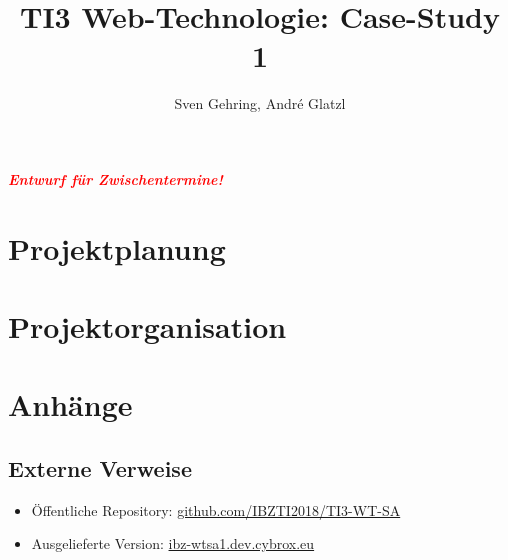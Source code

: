 \documentclass{article}
\begin{document}

\title{TI3 Web-Technologie: Case-Study 1}
\author{Sven Gehring, André Glatzl}
\date{}
\maketitle

\begin{abstract}

\end{abstract}

\vspace{3cm}
\begin{center}
  \textcolor{red}{\textbf{\emph{Entwurf für Zwischentermine!}}}
\end{center}

\clearpage
\tableofcontents
\clearpage

\section{Projektplanung}







\section{Projektorganisation}



\section{Anhänge}
\subsection{Externe Verweise}
\begin{itemize}
  \item Öffentliche Repository: \href{https://github.com/IBZTI2018/TI3-WT-SA}{github.com/IBZTI2018/TI3-WT-SA}
  \item Ausgelieferte Version: \href{https://ibz-wtsa1.dev.cybrox.eu/}{ibz-wtsa1.dev.cybrox.eu}
\end{itemize}
\end{document}
